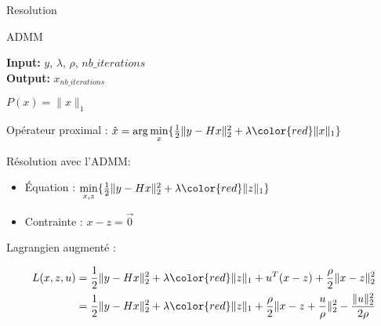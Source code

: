 \begin{frame}{Resolution}

\begin{algorithm}[H]
    \caption{ADMM} %
    \begin{algorithmic}[1]
        \newline
        \textbf{Input:} $y$, $\lambda$, $\rho$, $nb\_iterations$ \\
        \textbf{Output:} $x_{nb\_iterations}$
        \EndFor
        \EndProcedure
    \end{algorithmic}
\end{algorithm}
\end{frame}

\begin{frame}{$P(x) = \lVert x \rVert_{1}$}

Opérateur proximal : $\hat{x} = \arg\min\limits_{x} \{ 
    \frac{1}{2} \lVert y - Hx \rVert_{2}^{2} 
    + \lambda {\color{red} \lVert x \rVert_{1} } 
\}$ \\

\vspace{5mm}

Résolution avec l'ADMM:
\begin{itemize}
    \item Équation : $\min\limits_{x, z} \{ 
        \frac{1}{2} \lVert y - Hx \rVert_{2}^{2} 
        + \lambda {\color{red} \lVert z \rVert_{1} } 
    \}$
    \item Contrainte : $x-z = \overrightarrow{0}$
\end{itemize}

\vspace{5mm}

Lagrangien augmenté :

\begin{align*}
L(x, z, u) 
&= \frac{1}{2} \lVert y - Hx \rVert_{2}^{2} + \lambda {\color{red} \lVert z \rVert_{1} }  +
u^{T}(x-z) + \frac{\rho}{2} \lVert x-z \rVert_{2}^{2} \\
&= \frac{1}{2} \lVert y - Hx \rVert_{2}^{2} + \lambda {\color{red} \lVert z \rVert_{1} }  +
\frac{\rho}{2} \lVert x-z+\frac{u}{\rho} \rVert_{2}^{2} - \frac{\lVert u \rVert_{2}^{2}}{2\rho}    
\end{align*}

\end{frame}

